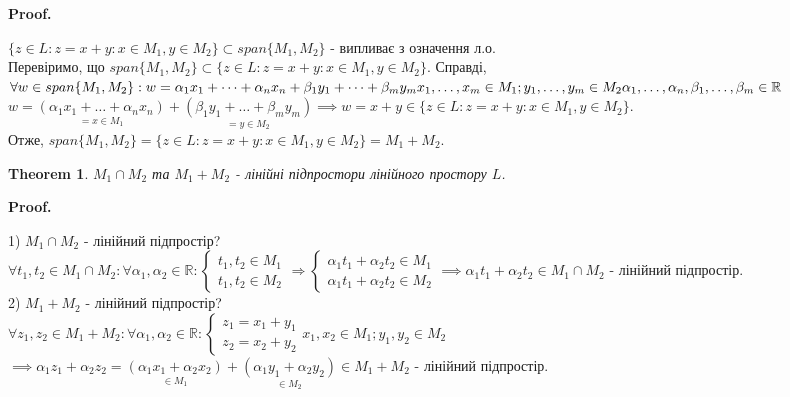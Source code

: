 \documentclass[a4paper, 10pt]{article}
\makeatletter
\def\qed{$\blacksquare$}
\theoremstyle{theoremdd}
\newtheorem{theorem}{Theorem}[subsection]
\theoremstyle{theoremdd}
\theoremstyle{theoremdd}
\theoremstyle{theoremdd}
\theoremstyle{theoremdd}
\theoremstyle{theoremdd}
\theoremstyle{theoremdd}
\theoremstyle{theoremdd}
\renewenvironment{proof}[1][Proof.\\]{\par
\pushQED{\hfill \qed}%
\normalfont \topsep6\p@\@plus6\p@\relax
\trivlist
\item\relax
{\bfseries
#1\@addpunct{.}}\hspace\labelsep\ignorespaces
}{%
\popQED\endtrivlist\@endpefalse
}
\makeatother
\begin{document}
	\begin{proof}
	$\{z \in L: z = x+y: x \in M_1, y \in M_2\} \subset span\{M_1, M_2\}$ - випливає з означення л.о.\\
	Перевіримо, що $span\{M_1, M_2\} \subset \{z \in L: z = x+y: x \in M_1, y \in M_2\}$. Справді,\\
	$\forall w \in span\{M_1, M_2\}: w = \alpha_1 x_1 + \dots + \alpha_n x_n + \beta_1 y_1 + \dots + \beta_m y_m \\ x_1, \dots, x_m \in M_1; y_1, \dots, y_m \in M_2 \\ \alpha_1, \dots, \alpha_n, \beta_1, \dots, \beta_m \in \mathbb{R}$\\
	$w = \underset{= x \in M_1}{(\alpha_1 x_1 + \dots + \alpha_n x_n )}+ \underset{= y \in M_2}{(\beta_1 y_1 + \dots + \beta_m y_m)} \implies w = x + y \in \{z \in L: z = x+y: x \in M_1, y \in M_2\}$.\\
	Отже, $span\{M_1, M_2\} = \{z \in L: z = x+y: x \in M_1, y \in M_2\} = M_1 + M_2$.
	\end{proof}
	
	\begin{theorem}
	$M_1 \cap M_2$ та $M_1 + M_2$ - лінійні підпростори лінійного простору $L$.
	\end{theorem}
	
	\begin{proof}
	1) $M_1 \cap M_2$ - лінійний підпростір?\\
	$\forall t_1, t_2 \in M_1 \cap M_2: \forall \alpha_1, \alpha_2 \in \mathbb{R}: \begin{cases} t_1, t_2 \in M_1 \\ t_1, t_2 \in M_2 \end{cases} \Rightarrow \begin{cases} \alpha_1 t_1 + \alpha_2 t_2 \in M_1 \\ \alpha_1 t_1 + \alpha_2 t_2 \in M_2 \end{cases} \implies \alpha_1 t_1 + \alpha_2 t_2 \in M_1 \cap M_2$ - лінійний підпростір.
	\bigskip \\
	2) $M_1 + M_2$ - лінійний підпростір?\\
	$\forall z_1, z_2 \in M_1 + M_2: \forall \alpha_1, \alpha_2 \in \mathbb{R}: \begin{cases} z_1 = x_1 + y_1 \\ z_2 = x_2 + y_2 \end{cases}x_1,x_2 \in M_1; y_1, y_2 \in M_2$\\
	$\implies \alpha_1 z_1 + \alpha_2 z_2 = \underset{\in M_1}{(\alpha_1 x_1 + \alpha_2 x_2)} + \underset{\in M_2}{(\alpha_1 y_1 + \alpha_2 y_2)} \in M_1 + M_2$ - лінійний підпростір.
	\end{proof}
	
\end{document}
